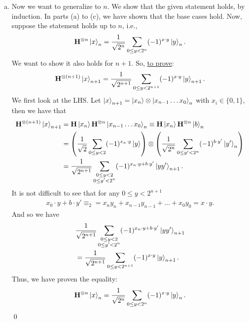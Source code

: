 \documentclass{book}
\theoremstyle{definition}
\newcommand{\nn}{\nonumber}
\newcommand{\f}[2]{\frac{#1}{#2}}
\newcommand{\lp}{\left(}
\newcommand{\rp}{\right)}
\newcommand{\had}{\mathbf{H}}
\begin{document}
\begin{enumerate}[(a)]
	
	
	\item Now we want to generalize to $n$. We show that the given statement holds, by induction. In parts (a) to (c), we have shown that the base cases hold. Now, suppose the statement holds up to $n$, i.e.,
	\begin{align}
	\had^{\otimes n}\ket{x}_n = \f{1}{\sqrt{2^n}} \sum_{0 \leq y < 2^n}(-1)^{x\cdot y}\ket{y}_n.
	\end{align}
	We want to show it also holds for $n+1$. So, \underline{to prove}:
	\begin{align}
	\had^{\otimes (n+1)}\ket{x}_{n+1} = \f{1}{\sqrt{2^{n+1}}} \sum_{0 \leq y < 2^{n+1}}(-1)^{x\cdot y}\ket{y}_{n+1}.
	\end{align}
	We first look at the LHS. Let $\ket{x}_{n+1} = \ket{x_n}\otimes \ket{x_{n-1}\dots x_0}_{n}$ with $x_i\in\{0,1\}$, then we have that
	\begin{align}
	\had^{\otimes (n+1)}\ket{x}_{n+1} &= \had \ket{x_n} \had^{\otimes n}\ket{x_{n-1}\dots x_0}_n \equiv \had \ket{x_n} \had^{\otimes n}\ket{b}_n \nn\\
	&= \lp \f{1}{\sqrt{2}}\sum_{0\leq y < 2}(-1)^{x_n\cdot y}\ket{y} \rp \otimes \lp \f{1}{\sqrt{2^n}} \sum_{0 \leq y' < 2^n}(-1)^{b\cdot y'}\ket{y'}_n \rp\nn\\
	&=  \f{1}{\sqrt{2^{n+1}}}\sum\limits_{\substack{0\leq y < 2\\0 \leq y' < 2^n}}   (-1)^{x_n\cdot y + b\cdot y'}\ket{yy'}_{n+1}.
	\end{align}
	It is not difficult to see that for any $0 \leq y < 2^{n+1}$
	\begin{align}
	x_0\cdot y + b\cdot y' \equiv_2 = x_ny_n + x_{n-1}y_{n-1} + \dots + x_0 y_0 = x\cdot y.
	\end{align}
	And so we have
	\begin{align}
	&\f{1}{\sqrt{2^{n+1}}}\sum\limits_{\substack{0\leq y < 2\\0 \leq y' < 2^n}}   (-1)^{x_n\cdot y + b\cdot y'}\ket{yy'}_{n+1}\nn\\
	&= \f{1}{\sqrt{2^{n+1}}}\sum_{0 \leq y< 2^{n+1}}  (-1)^{x\cdot y}\ket{y}_{n+1}.
	\end{align}
	Thus, we have proven the equality:
	\begin{align}
	\had^{\otimes n}\ket{x}_n = \f{1}{\sqrt{2^n}} \sum_{0 \leq y < 2^n}(-1)^{x\cdot y}\ket{y}_n.
	\end{align}
	\qed
	
	
\end{enumerate}







\newpage
\end{document}
